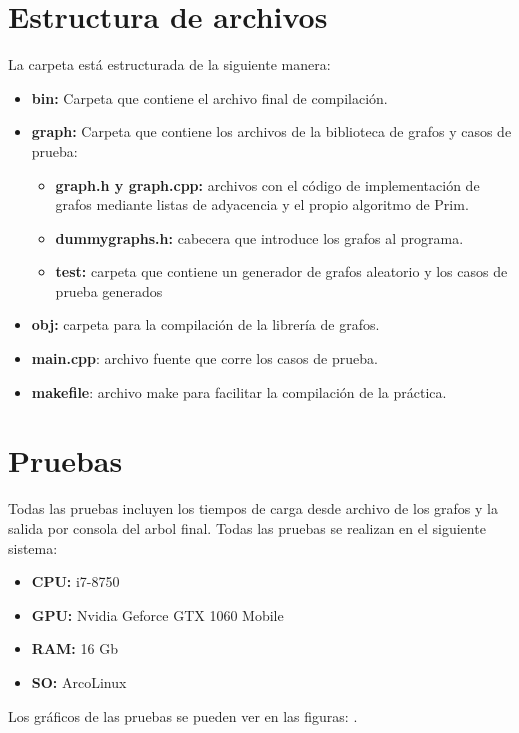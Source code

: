 \section{Estructura de archivos}
La carpeta está estructurada de la siguiente manera:
\begin{itemize}
    \item\textbf{bin:} Carpeta que contiene el archivo final de compilación.
    \item\textbf{graph:} Carpeta que contiene los archivos de la biblioteca de grafos y casos de prueba:
    \begin{itemize}
       \item\textbf{graph.h y graph.cpp:} archivos con el código de implementación de grafos mediante listas de adyacencia y el propio algoritmo de Prim.
       \item\textbf{dummygraphs.h:} cabecera que introduce los grafos al programa.
       \item\textbf{test:} carpeta que contiene un generador de grafos aleatorio y los casos de prueba generados
    \end{itemize}
    \item\textbf{obj:} carpeta para la compilación de la librería de grafos.
    \item\textbf{main.cpp}: archivo fuente que corre los casos de prueba.
    \item\textbf{makefile}: archivo make para facilitar la compilación de la práctica.
\end{itemize}

\section{Pruebas}
Todas las pruebas incluyen los tiempos de carga desde archivo de los grafos y la salida por consola del arbol final. Todas las pruebas se realizan en el siguiente sistema:
\begin{itemize}
    \item\textbf{CPU:} i7-8750
    \item\textbf{GPU:} Nvidia Geforce GTX 1060 Mobile
    \item\textbf{RAM:} 16 Gb
    \item\textbf{SO:} ArcoLinux
\end{itemize}

Los gráficos de las pruebas se pueden ver en las figuras: .
